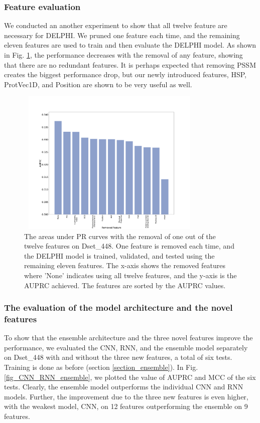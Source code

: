\subsubsection{Feature evaluation}
We conducted an another experiment to show that all twelve feature are necessary for DELPHI. We pruned one feature each time, and the remaining eleven features are used to train and then evaluate the DELPHI model. As shown in Fig. \ref{fig_remove_each_feature}, the performance decreases with the removal of any feature, showing that there are no redundant features. It is perhaps expected that  removing PSSM creates the biggest performance drop, but our newly introduced features, HSP, ProtVec1D, and Position are shown to be  very useful as well. 
\begin{figure}[!h]
\begin{center}
\includegraphics[height = 7cm, width = 9cm]{img/remove_features_individually_Testing.pdf}
\caption[The areas under PR curves with the removal of one out of the twelve features on Dset\_448]{The areas under PR curves with the removal of one out of the twelve features on Dset\_448. One feature is removed each time, and the DELPHI model is trained, validated, and tested using the remaining eleven features. The x-axis shows the removed features where 'None' indicates using all twelve features, and the y-axis is the AUPRC achieved. The features are sorted by the AUPRC values. } \label{fig_remove_each_feature}
\end{center}
\end{figure}

\subsubsection{The evaluation of the model architecture and the novel features\label{sec_arch_fea}}
To show that the ensemble architecture and the three novel features improve the performance, we evaluated the CNN, RNN, and the ensemble model separately on Dset\_448 with and without the three new features, a total of six tests. Training is done as before (section \ref{section_ensemble}). In Fig. \ref{fig_CNN_RNN_ensemble}, we plotted the value of AUPRC and MCC of the six tests. Clearly, the ensemble model outperforms the individual CNN and RNN models. Further, the improvement due to the three new features is even higher, with the weakest model, CNN, on 12 features outperforming the ensemble on 9 features. 

